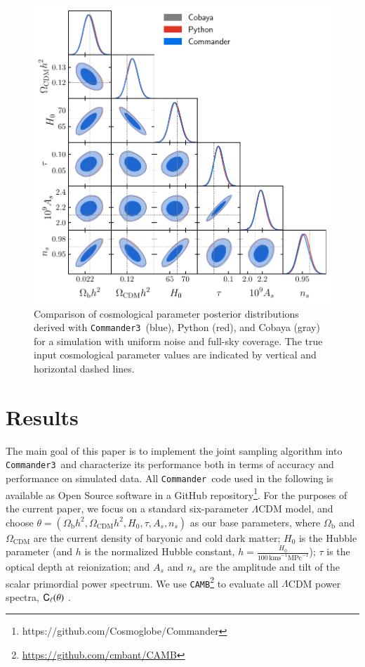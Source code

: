 \documentclass[twocolumn]{../common/aa}
\def\commander{\texttt{Commander}}
\def\commanderthree{\texttt{Commander3}}
\renewcommand{\C}[0]{\tens{C}}
\begin{document}
\begin{figure}
	\centering
	\includegraphics[width=\linewidth]{figures/dist_posterior_no_mask.pdf}
	\caption{\label{fig:nomask}Comparison of cosmological parameter posterior distributions derived with \commanderthree\ (blue), Python (red), and Cobaya (gray) for a simulation with uniform noise and full-sky coverage. The true input cosmological parameter values are indicated by vertical and horizontal dashed lines.}
\end{figure}


\section{Results}
\label{sec:results}

The main goal of this paper is to implement the joint sampling algorithm into \commanderthree\ and characterize its performance both in terms of accuracy and performance on simulated data. All \commander\ code used in the following is available as Open Source software in a GitHub repository\footnote{https://github.com/Cosmoglobe/Commander}. For the purposes of the current paper, we focus on a standard six-parameter $\Lambda$CDM model, and choose $\theta=(\Omega_{\textrm{b}}h^2, \Omega_{\textrm{CDM}}h^2, H_0, \tau, A_s, n_s)$ as our base parameters, where $\Omega_\mathrm{b}$ and $\Omega_\mathrm{CDM}$ are the current density of baryonic and cold dark matter; $H_0$ is the Hubble parameter (and $h$ is the normalized Hubble constant, $h=\frac{H_0}{100\,\mathrm{km s}^{-1} \mathrm{MPc}^{-1}}$); $\tau$ is the optical depth at reionization; and $A_s$ and $n_s$ are the amplitude and tilt of the scalar primordial power spectrum. We use \texttt{CAMB}\footnote{\url{https://github.com/cmbant/CAMB}} to evaluate all $\Lambda$CDM power spectra, $\C_{\ell}(\theta)$ \citep{Lewis:1999bs}. 
\end{document}
